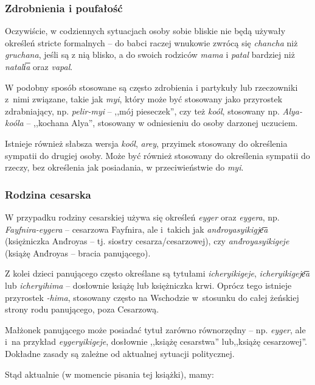 \begin{spacing}{1.1}
\subsubsection{Zdrobnienia i poufałość}

Oczywiście, w codziennych sytuacjach osoby sobie bliskie nie będą używały
określeń stricte formalnych -- do babci raczej wnukowie zwrócą się
\emph{chancha} niż \emph{gruchana}, jeśli są z nią blisko, a do swoich rodziców
\emph{mama} i \emph{patal} bardziej niż \emph{natali͞a} oraz \emph{vapal}.

W podobny sposób stosowane są często zdrobienia i partykuły lub rzeczowniki
z~nimi związane, takie jak \emph{myi}, który może być stosowany jako przyrostek
zdrabniający, np. \emph{pelir-myi} -- ,,mój pieseczek'', czy też \emph{koól},
stosowany np. \emph{Alya-koóla} -- ,,kochana Alya'', stosowany w odniesieniu do
osoby darzonej uczuciem.

Istnieje również słabsza wersja \emph{koól}, \emph{arey}, przyimek stosowany do
określenia sympatii do drugiej osoby. Może być również stosowany do określenia
sympatii do rzeczy, bez określenia jak posiadania, w przeciwieństwie do
\emph{myi}.

\subsubsection{Rodzina cesarska}

W przypadku rodziny cesarskiej używa się określeń \emph{eyger} oraz
\emph{eygera}, np. \emph{Fayfnira-eygera} -- cesarzowa Fayfnira, ale i~takich
jak \emph{and́royasyikigje͞a} (księżniczka And́royas -- tj. siostry
cesarza/cesarzowej), czy \emph{and́royasyikigeje} (książę And́royas -- bracia
panującego).

Z kolei dzieci panującego często określane są tytułami \emph{icheryikigeje},
\emph{icheryikigeje͞a} lub \emph{icheryihima} -- dosłownie książę lub
księżniczka krwi. Oprócz tego istnieje przyrostek \emph{-hima}, stosowany często
na Wschodzie w~stosunku do całej żeńskiej strony rodu panującego, poza
Cesarzową.

Małżonek panującego może posiadać tytuł zarówno równorzędny -- np. \emph{eyger},
ale i~na przykład \emph{eygeryikigeje}, dosłownie ,,książę cesarstwa''
lub,,książę cesarzowej''. Dokładne zasady są zależne od aktualnej sytuacji
politycznej.

Stąd aktualnie (w momencie pisania tej książki), mamy:


\end{spacing}
